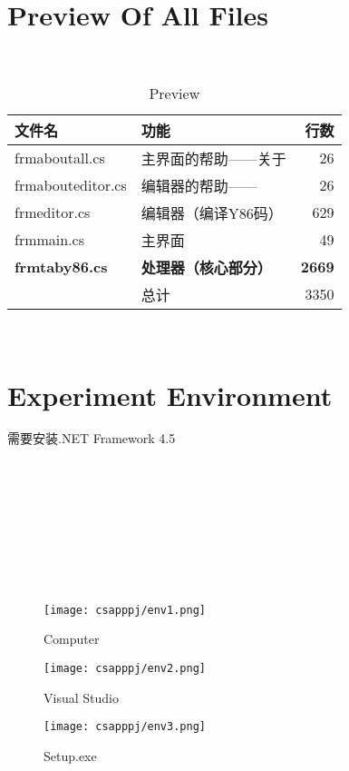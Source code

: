\documentclass{article}
\begin{document}
\begin{spacing}{1.5}
\section{Preview Of All Files}
\noindent
{}
\setlength{\hangindent}{2.8em}\\
\begin{table}[htbp]
\centering
\begin{tabular}{llr}  
\hline
文件名 & 功能 & 行数\\ \hline  
frmaboutall.cs & 主界面的帮助——关于 & 26\\         
frmabouteditor.cs & 编辑器的帮助—— & 26\\      
frmeditor.cs & 编辑器（编译Y86码） & 629\\
frmmain.cs & 主界面 & 49\\
\textbf{frmtaby86.cs} &  \textbf{处理器（核心部分）} & \textbf{2669}\\ 
 & 总计 & 3350 \\ \hline
\end{tabular}
\caption{Preview}
\end{table}\\
\section{Experiment Environment}
需要安装.NET Framework 4.5\\\\\\\\\\\\\\\\\\
\begin{figure}[htbp]
\centering
\texttt{[image: csapppj/env1.png]}
\caption{Computer}
\end{figure}
\begin{figure}[htbp]
\centering
\texttt{[image: csapppj/env2.png]}
\caption{Visual Studio}
\end{figure}
\begin{figure}[htbp]
\centering
\texttt{[image: csapppj/env3.png]}
\caption{Setup.exe}
\end{figure}

\end{spacing}
\end{document}
